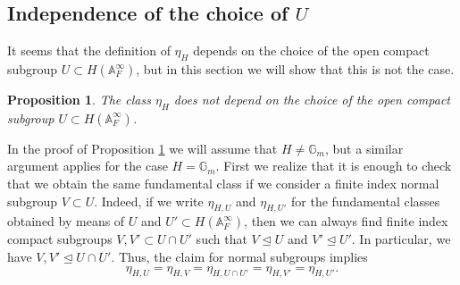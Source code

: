 \documentclass{amsart}
\newtheorem{proposition}[theorem]{Proposition}
\theoremstyle{definition}
\theoremstyle{remark}
\numberwithin{equation}{section}
\newcommand{\A}{{\mathbb A}}
\newcommand{\G}{{\mathbb G}}
\begin{document}
\subsection{Independence of the choice of $U$}\label{IndepU} It seems that the definition of $\eta_H$ depends on the choice of the open compact subgroup $U\subset H(\A_F^\infty)$, but in this section we will show that this is not the case. 
\begin{proposition}\label{prop:indep of U}
    The class $\eta_H$ does not depend on the choice of the open compact subgroup $U\subset H(\A_F^\infty)$.
\end{proposition}
In the proof of Proposition \ref{prop:indep of U} we will assume that $H\neq \G_m$, but a similar argument applies for the case $H=\G_m$. 
First we realize that it is enough to check that we obtain the same fundamental class if we consider a finite index normal subgroup $V\subset U$. Indeed, if we write $\eta_{H,U}$ and $\eta_{H,U'}$ for the fundamental classes obtained by means of $U$ and $U'\subset H(\A_F^\infty)$, then we can always find finite index compact subgroups $V,V'\subset U\cap U'$ such that $V\unlhd U$ and $V'\unlhd U'$. In particular, we have $V,V'\unlhd U\cap U'$. Thus, the claim for normal subgroups implies 
\[
\eta_{H,U}=\eta_{H,V}=\eta_{H,U\cap U'}=\eta_{H,V'}=\eta_{H,U'}.
\]
\end{document}
